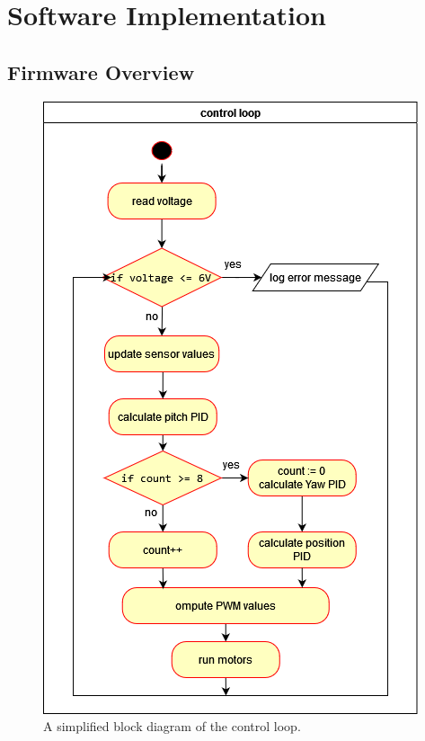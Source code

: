 \section{Software Implementation}
\subsection{Firmware Overview}
\begin{figure}[h]
	\centering
	\includegraphics[width=0.5\linewidth]{assets/Control_Loop.png}
	\caption{A simplified block diagram of the control loop. }
	\label{fig:control-loop}
\end{figure}
